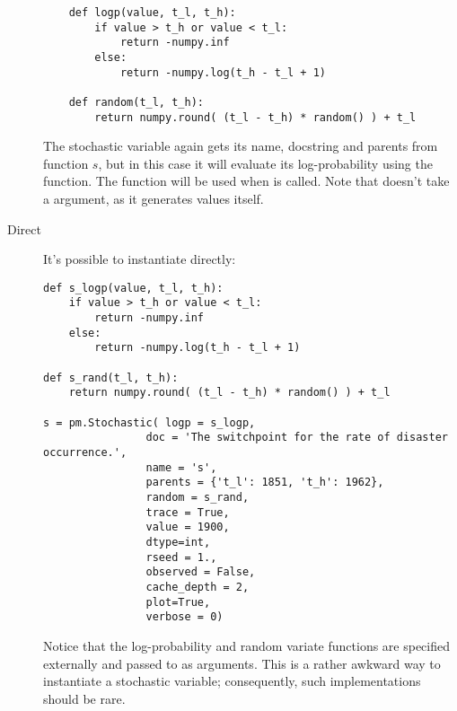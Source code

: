 \begin{description}
\begin{verbatim}
    def logp(value, t_l, t_h):
        if value > t_h or value < t_l:
            return -numpy.inf
        else:
            return -numpy.log(t_h - t_l + 1)

    def random(t_l, t_h):
        return numpy.round( (t_l - t_h) * random() ) + t_l

    \end{verbatim}
The stochastic variable again gets its name, docstring and parents from function $s$, but in this case it will evaluate its log-probability using the  function. The  function will be used when  is called. Note that  doesn't take a  argument, as it generates values itself.

    \item[Direct] It's possible to instantiate  directly:
\begin{verbatim}
def s_logp(value, t_l, t_h):
    if value > t_h or value < t_l:
        return -numpy.inf
    else:
        return -numpy.log(t_h - t_l + 1)

def s_rand(t_l, t_h):
    return numpy.round( (t_l - t_h) * random() ) + t_l

s = pm.Stochastic( logp = s_logp,
                doc = 'The switchpoint for the rate of disaster occurrence.',
                name = 's',
                parents = {'t_l': 1851, 't_h': 1962},
                random = s_rand,
                trace = True,
                value = 1900,
                dtype=int,
                rseed = 1.,
                observed = False,
                cache_depth = 2,
                plot=True,
                verbose = 0)
\end{verbatim}
Notice that the log-probability and random variate functions are specified externally and passed to  as arguments. This is a rather awkward way to instantiate a stochastic variable; consequently, such implementations should be rare.

\end{description}

